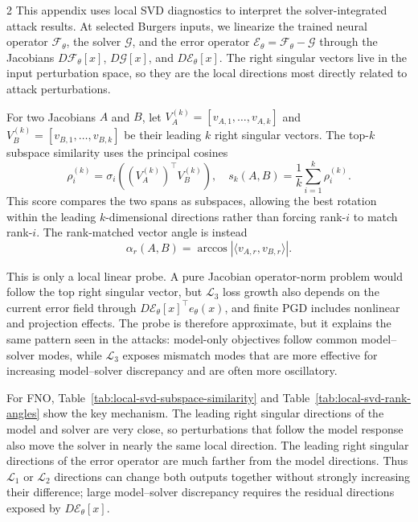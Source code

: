 \documentclass[letterpaper]{article} %
\newcommand{\tabref}[1]{Table~\ref{#1}}
\begin{document}
\begin{multicols}{2}
This appendix uses local SVD diagnostics to interpret the solver-integrated
attack results. At selected Burgers inputs, we linearize the trained neural
operator $\mathcal{F}_\theta$, the solver $\mathcal{G}$, and the error operator
$\mathcal{E}_\theta=\mathcal{F}_\theta-\mathcal{G}$ through the Jacobians
$D\mathcal{F}_\theta[x]$, $D\mathcal{G}[x]$, and
$D\mathcal{E}_\theta[x]$. The right singular vectors live in the input
perturbation space, so they are the local directions most directly related to
attack perturbations.

For two Jacobians $A$ and $B$, let
$V_A^{(k)}=[v_{A,1},\ldots,v_{A,k}]$ and
$V_B^{(k)}=[v_{B,1},\ldots,v_{B,k}]$ be their leading $k$ right singular
vectors. The top-$k$ subspace similarity uses the principal cosines
\begin{equation*}
  \rho_i^{(k)}
  =
  \sigma_i\!\left((V_A^{(k)})^\top V_B^{(k)}\right),
  \quad
  s_k(A,B)=\frac{1}{k}\sum_{i=1}^k \rho_i^{(k)} .
\end{equation*}
This score compares the two spans as subspaces, allowing the best rotation
within the leading $k$-dimensional directions rather than forcing rank-$i$ to
match rank-$i$. The rank-matched vector angle is instead
\begin{equation*}
  \alpha_r(A,B)
  =
  \arccos |\langle v_{A,r},v_{B,r}\rangle| .
\end{equation*}

This is only a local linear probe. A pure Jacobian operator-norm problem would
follow the top right singular vector, but $\mathcal{L}_3$ loss growth also
depends on the current error field through
$D\mathcal{E}_\theta[x]^\top e_\theta(x)$, and finite PGD includes nonlinear
and projection effects. The probe is therefore approximate, but it explains
the same pattern seen in the attacks: model-only objectives follow common
model--solver modes, while $\mathcal{L}_3$ exposes mismatch modes that are more
effective for increasing model--solver discrepancy and are often more
oscillatory.

For FNO, \tabref{tab:local-svd-subspace-similarity} and
\tabref{tab:local-svd-rank-angles} show the key mechanism. The leading right
singular directions of the model and solver are very close, so perturbations
that follow the model response also move the solver in nearly the same local
direction. The leading right singular directions of the error operator are
much farther from the model directions. Thus $\mathcal{L}_1$ or $\mathcal{L}_2$ directions
can change both outputs together without strongly increasing their difference;
large model--solver discrepancy requires the residual directions exposed by
$D\mathcal{E}_\theta[x]$.
\end{multicols}
\end{document}
